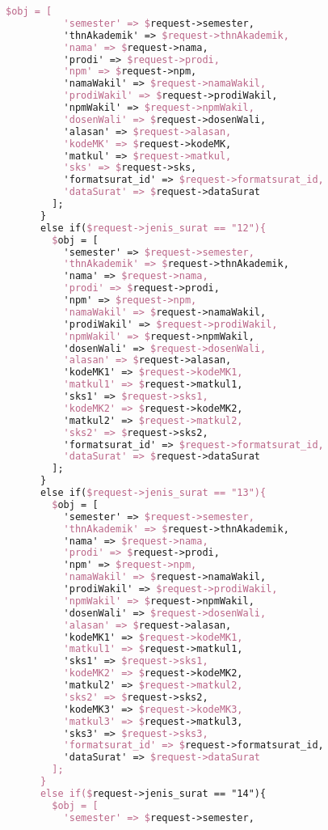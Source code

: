 \begin{lstlisting}[language=tex,basicstyle=\tiny,caption=PesanansuratController.php]
        $obj = [
          'semester' => $request->semester,
          'thnAkademik' => $request->thnAkademik,
          'nama' => $request->nama,
          'prodi' => $request->prodi,
          'npm' => $request->npm,
          'namaWakil' => $request->namaWakil,
          'prodiWakil' => $request->prodiWakil,
          'npmWakil' => $request->npmWakil,
          'dosenWali' => $request->dosenWali,
          'alasan' => $request->alasan,
          'kodeMK' => $request->kodeMK,
          'matkul' => $request->matkul,
          'sks' => $request->sks,
          'formatsurat_id' => $request->formatsurat_id,
          'dataSurat' => $request->dataSurat
        ];
      }
      else if($request->jenis_surat == "12"){
        $obj = [
          'semester' => $request->semester,
          'thnAkademik' => $request->thnAkademik,
          'nama' => $request->nama,
          'prodi' => $request->prodi,
          'npm' => $request->npm,
          'namaWakil' => $request->namaWakil,
          'prodiWakil' => $request->prodiWakil,
          'npmWakil' => $request->npmWakil,
          'dosenWali' => $request->dosenWali,
          'alasan' => $request->alasan,
          'kodeMK1' => $request->kodeMK1,
          'matkul1' => $request->matkul1,
          'sks1' => $request->sks1,
          'kodeMK2' => $request->kodeMK2,
          'matkul2' => $request->matkul2,
          'sks2' => $request->sks2,
          'formatsurat_id' => $request->formatsurat_id,
          'dataSurat' => $request->dataSurat
        ];
      }
      else if($request->jenis_surat == "13"){
        $obj = [
          'semester' => $request->semester,
          'thnAkademik' => $request->thnAkademik,
          'nama' => $request->nama,
          'prodi' => $request->prodi,
          'npm' => $request->npm,
          'namaWakil' => $request->namaWakil,
          'prodiWakil' => $request->prodiWakil,
          'npmWakil' => $request->npmWakil,
          'dosenWali' => $request->dosenWali,
          'alasan' => $request->alasan,
          'kodeMK1' => $request->kodeMK1,
          'matkul1' => $request->matkul1,
          'sks1' => $request->sks1,
          'kodeMK2' => $request->kodeMK2,
          'matkul2' => $request->matkul2,
          'sks2' => $request->sks2,
          'kodeMK3' => $request->kodeMK3,
          'matkul3' => $request->matkul3,
          'sks3' => $request->sks3,
          'formatsurat_id' => $request->formatsurat_id,
          'dataSurat' => $request->dataSurat
        ];
      }
      else if($request->jenis_surat == "14"){
        $obj = [
          'semester' => $request->semester,

\end{lstlisting}
